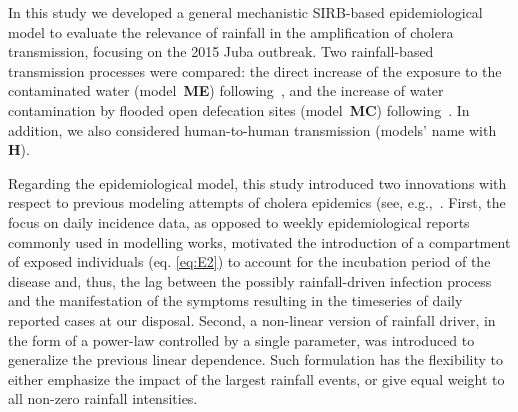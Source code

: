 In this study we developed a general mechanistic SIRB-based epidemiological model to evaluate the relevance of rainfall in the amplification of cholera transmission, focusing on the 2015 Juba outbreak. Two rainfall-based transmission processes were compared: the direct increase of the exposure to the contaminated water (model~\textbf{ME}) following~\cite{eisenbergExaminingRainfallCholera2013}, and the increase of water contamination by flooded open defecation sites (model~\textbf{MC}) following~\cite{Rinaldo:Reassessment20102011:2012}. In addition, we also considered human-to-human transmission (models' name with \textbf{H}).

Regarding the epidemiological model, this study introduced two innovations with respect to previous modeling attempts of cholera epidemics (see, e.g.,~\cite{bertuzzoProbabilityExtinctionHaiti2016,pasettoRealtimeProjectionsCholera2017}. First, the focus on daily incidence data, as opposed to weekly epidemiological reports commonly used in modelling works, motivated the introduction of a compartment of exposed individuals (eq. \ref{eq:E2}) to account for the incubation period of the disease and, thus, the lag between the possibly rainfall-driven infection process and the manifestation of the symptoms resulting in the timeseries of daily reported cases at our disposal. %
Second, a non-linear version of rainfall driver, in the form of a power-law controlled by a single parameter, was introduced to generalize the previous linear dependence. Such formulation has the flexibility to either emphasize the impact of the largest rainfall events, or give equal weight to all non-zero rainfall intensities. %

